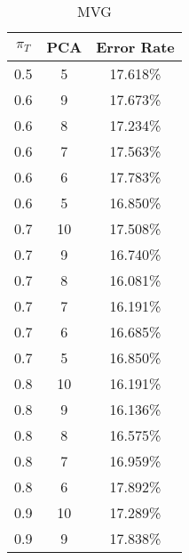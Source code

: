 \begin{center}
\begin{longtable}{|c|c|c|}
\caption{MVG}\label{tab:mvg_acctable}\\
\hline
$\pi_T$ & PCA & Error Rate\\
\hline
0.5 & 5 & 17.618\% \\
\hline
0.6 & 9 & 17.673\% \\
\hline
0.6 & 8 & 17.234\% \\
\hline
0.6 & 7 & 17.563\% \\
\hline
0.6 & 6 & 17.783\% \\
\hline
0.6 & 5 & 16.850\% \\
\hline
0.7 & 10 & 17.508\% \\
\hline
0.7 & 9 & 16.740\% \\
\hline
0.7 & 8 & 16.081\% \\
\hline
0.7 & 7 & 16.191\% \\
\hline
0.7 & 6 & 16.685\% \\
\hline
0.7 & 5 & 16.850\% \\
\hline
0.8 & 10 & 16.191\% \\
\hline
0.8 & 9 & 16.136\% \\
\hline
0.8 & 8 & 16.575\% \\
\hline
0.8 & 7 & 16.959\% \\
\hline
0.8 & 6 & 17.892\% \\
\hline
0.9 & 10 & 17.289\% \\
\hline
0.9 & 9 & 17.838\% \\
\hline
\hline
\end{longtable}
\end{center}
